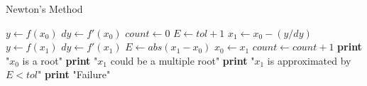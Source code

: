 \documentclass{article}
\begin{document}
  \begin{algorithm}
    \caption{Newton's Method}
    \begin{algorithmic}[1]
        \State $y \gets f(x_{0})$
        \State $dy \gets f'(x_{0})$
        \State $count \gets 0$
        \State $E \gets tol + 1$
          \State $x_{1} \gets x_{0} - (y/dy)$
          \State $y \gets f(x_{1})$
          \State $dy \gets f'(x_{1})$
          \State $E \gets abs(x_{1} - x_{0})$
          \State $x_{0} \gets x_{1}$
          \State $count \gets count + 1$
        \EndWhile
          \State \textbf{print} "$x_{0}$ is a root"
          \State \textbf{print} "$x_{1}$ could be a multiple root"
          \State \textbf{print} "$x_{1}$ is approximated by $E < tol$"
        \Else
          \State \textbf{print} "Failure"
        \EndIf
      \EndProcedure
    \end{algorithmic}
  \end{algorithm}
\end{document}
